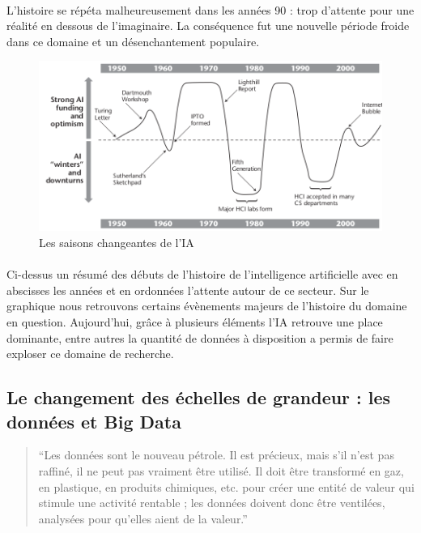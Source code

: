 \documentclass[10pt, french, a4paper]{report}
\begin{document}
\paragraph{}
L’histoire se répéta malheureusement dans les années 90 : trop d’attente pour une réalité en dessous de l’imaginaire. La conséquence fut une nouvelle période froide dans ce domaine et un désenchantement populaire.

\begin{center}
  \begin{figure}[hbt!]
      \includegraphics[width=\textwidth]{images/grudin_2009_changing_seasons_ai.png}
      \caption{Les saisons changeantes de l'IA \citep{grudin_ai_2009}}
  \end{figure}
\end{center}

\paragraph{}
Ci-dessus un résumé des débuts de l’histoire de l’intelligence artificielle avec en abscisses les années et en ordonnées l’attente autour de ce secteur. Sur le graphique nous retrouvons certains évènements majeurs de l’histoire du domaine en question. Aujourd'hui, grâce à plusieurs éléments l'IA retrouve une place dominante, entre autres la quantité de données à disposition a permis de faire exploser ce domaine de recherche. 

\subsection{Le changement des échelles de grandeur : les données et Big Data}

\begin{quotation}
  ``Les données sont le nouveau pétrole. Il est précieux, mais s'il n'est pas raffiné, il ne peut pas vraiment être utilisé. Il doit être transformé en gaz, en plastique, en produits chimiques, etc. pour créer une entité de valeur qui stimule une activité rentable ; les données doivent donc être ventilées, analysées pour qu'elles aient de la valeur.''
\end{quotation}
\end{document}
